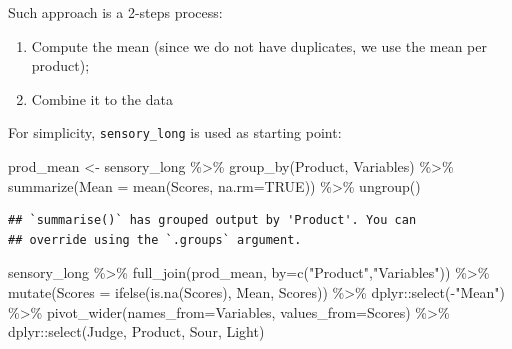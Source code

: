 \documentclass[
]{krantz}
\makeatletter
\newenvironment{Shaded}{\begin{snugshade}}{\end{snugshade}}
\newcommand{\AttributeTok}[1]{\textcolor[rgb]{0.61,0.61,0.61}{#1}}
\newcommand{\ConstantTok}[1]{\textcolor[rgb]{0,0,0}{#1}}
\newcommand{\FunctionTok}[1]{\textcolor[rgb]{0,0,0}{#1}}
\newcommand{\NormalTok}[1]{#1}
\newcommand{\OtherTok}[1]{\textcolor[rgb]{0.37,0.37,0.37}{#1}}
\newcommand{\SpecialCharTok}[1]{\textcolor[rgb]{0,0,0}{#1}}
\newcommand{\StringTok}[1]{\textcolor[rgb]{0.5,0.5,0.5}{#1}}
\providecommand{\tightlist}{%
  \setlength{\itemsep}{0pt}\setlength{\parskip}{0pt}}
\newenvironment{kframe}{%
\medskip{}
\setlength{\fboxsep}{.8em}
 \def\at@end@of@kframe{}%
 \ifinner\ifhmode%
  \def\at@end@of@kframe{\end{minipage}}%
  \begin{minipage}{\columnwidth}%
 \fi\fi%
 \def\FrameCommand##1{\hskip\@totalleftmargin \hskip-\fboxsep
 \colorbox{shadecolor}{##1}\hskip-\fboxsep
     \hskip-\linewidth \hskip-\@totalleftmargin \hskip\columnwidth}%
 \MakeFramed {\advance\hsize-\width
   \@totalleftmargin\z@ \linewidth\hsize
   \@setminipage}}%
 {\par\unskip\endMakeFramed%
 \at@end@of@kframe}
\renewenvironment{Shaded}{\begin{kframe}}{\end{kframe}}
\makeatother
\begin{document}
Such approach is a 2-steps process:

\begin{enumerate}
\def\labelenumi{\arabic{enumi}.}
\tightlist
\item
  Compute the mean (since we do not have duplicates, we use the mean per product);
\item
  Combine it to the data
\end{enumerate}

For simplicity, \texttt{sensory\_long} is used as starting point:

\begin{Shaded}
\begin{Highlighting}[]
\NormalTok{prod\_mean }\OtherTok{\textless{}{-}}\NormalTok{ sensory\_long }\SpecialCharTok{\%\textgreater{}\%} 
  \FunctionTok{group\_by}\NormalTok{(Product, Variables) }\SpecialCharTok{\%\textgreater{}\%} 
  \FunctionTok{summarize}\NormalTok{(}\AttributeTok{Mean =} \FunctionTok{mean}\NormalTok{(Scores, }\AttributeTok{na.rm=}\ConstantTok{TRUE}\NormalTok{)) }\SpecialCharTok{\%\textgreater{}\%} 
  \FunctionTok{ungroup}\NormalTok{()}
\end{Highlighting}
\end{Shaded}

\begin{verbatim}
## `summarise()` has grouped output by 'Product'. You can
## override using the `.groups` argument.
\end{verbatim}

\begin{Shaded}
\begin{Highlighting}[]
\NormalTok{sensory\_long }\SpecialCharTok{\%\textgreater{}\%} 
  \FunctionTok{full\_join}\NormalTok{(prod\_mean, }\AttributeTok{by=}\FunctionTok{c}\NormalTok{(}\StringTok{"Product"}\NormalTok{,}\StringTok{"Variables"}\NormalTok{)) }\SpecialCharTok{\%\textgreater{}\%} 
  \FunctionTok{mutate}\NormalTok{(}\AttributeTok{Scores =} \FunctionTok{ifelse}\NormalTok{(}\FunctionTok{is.na}\NormalTok{(Scores), Mean, Scores)) }\SpecialCharTok{\%\textgreater{}\%} 
\NormalTok{  dplyr}\SpecialCharTok{::}\FunctionTok{select}\NormalTok{(}\SpecialCharTok{{-}}\StringTok{"Mean"}\NormalTok{) }\SpecialCharTok{\%\textgreater{}\%} 
  \FunctionTok{pivot\_wider}\NormalTok{(}\AttributeTok{names\_from=}\NormalTok{Variables, }\AttributeTok{values\_from=}\NormalTok{Scores) }\SpecialCharTok{\%\textgreater{}\%} 
\NormalTok{  dplyr}\SpecialCharTok{::}\FunctionTok{select}\NormalTok{(Judge, Product, Sour, Light)}
\end{Highlighting}
\end{Shaded}
\end{document}
